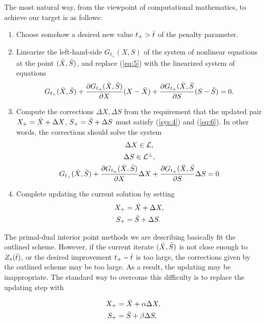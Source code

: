 \documentclass[11pt,a4paper]{article}
\begin{document}
The most natural way, from the viewpoint of computational mathematics, to achieve our target is as follows:
\begin{enumerate}
    \item Choose somehow a desired new value $t_+ > \Bar{t}$ of the penalty parameter.
    \item Linearize the left-hand-side $G_{t_+}(X,S)$ of the system of nonlinear equations at the point $(\Bar{X}, \Bar{S})$, and replace (\ref{eq:5}) with the linearized system of equations
    \begin{equation}\label{eq:6}
        G_{t_+}(\Bar{X},\Bar{S})+\frac{\partial G_{t_+}(\Bar{X},\Bar{S})}{\partial X}(X-\Bar{X})+\frac{\partial G_{t_+}(\Bar{X}, \Bar{S}}{\partial S}(S-\Bar{S}) = 0.
    \end{equation}
    \item Compute the corrections $\Delta X, \Delta S$ from the requirement that the updated pair $X_+ = \Bar{X}+\Delta X$, $S_+ = \Bar{S}+\Delta S$ must satisfy (\ref{sys:4}) and (\ref{eq:6}). In other words, the corrections should solve the system
    \begin{gather*}
        \Delta X \in \mathcal{L},\\
        \Delta S \in \mathcal{L}^\perp,\\
        G_{t_+}(\Bar{X},\Bar{S})+\frac{\partial G_{t_+}(\Bar{X},\Bar{S})}{\partial X}\Delta X+\frac{\partial G_{t_+}(\Bar{X}, \Bar{S}}{\partial S}\Delta S = 0
    \end{gather*}
    \item Complete updating the current solution by setting
    \begin{align*}
        X_+ &= \Bar{X}+\Delta X,\\
        S_+ &= \Bar{S}+\Delta S.
    \end{align*}
\end{enumerate}

The primal-dual interior point methods we are describing basically fit the outlined
scheme. However, if the current iterate $(\Bar{X},\Bar{S})$ is not close enough to $Z_*(\Bar{t})$, or the desired improvement $t_+-\Bar{t}$ is too large, the corrections given by the outlined scheme may be too large. As a result, the updating may be inappropriate. The standard way to overcome this difficulty is to replace the updating step with

\begin{align}
    X_+ &= \Bar{X}+\alpha \Delta X,\\
    S_+ &= \Bar{S}+\beta \Delta S,
\end{align}
\end{document}
